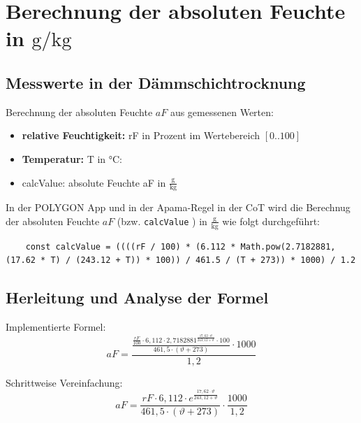 \section{Berechnung der absoluten Feuchte in \texorpdfstring{$\mathrm{g} / \mathrm{kg}$}{g / kg}} 


\subsection{Messwerte in der Dämmschichtrocknung}
Berechnung der absoluten Feuchte $aF$ aus gemessenen Werten:

\begin{itemize}
\item \textbf{relative Feuchtigkeit:} rF in Prozent im Wertebereich $[0 .. 100]$
\item \textbf{Temperatur:} T in °C: 
\item calcValue: absolute Feuchte aF in $\frac{\mathrm{g}}{\mathrm{kg}}$
\end{itemize}

In der POLYGON App und in der Apama-Regel in der CoT wird die Berechnug der absoluten Feuchte $aF$ (bzw. \texttt{calcValue} ) in $\frac{\mathrm{g}}{\mathrm{kg}}$ wie folgt durchgeführt:

\begin{verbatim}  
    const calcValue = ((((rF / 100) * (6.112 * Math.pow(2.7182881, (17.62 * T) / (243.12 + T)) * 100)) / 461.5 / (T + 273)) * 1000) / 1.2
\end{verbatim}

\subsection{Herleitung und Analyse der Formel}
Implementierte Formel:
\begin{equation}
    aF
    = \frac{\frac{\frac{rF}{100} \cdot 6{,}112 \cdot 2{,}7182881^{\frac{17{,}62 \cdot \vartheta}{243{,}12 + \vartheta}} \cdot 100}
                  {461{,}5 \cdot (\vartheta + 273)} \cdot 1000}
            {1{,}2} 
\end{equation}

Schrittweise Vereinfachung:
\begin{equation}
    aF
    = \frac{rF \cdot 6{,}112 \cdot e^{\frac{17{,}62 \cdot \vartheta}{243{,}12 + \vartheta}} }
            {461{,}5 \cdot (\vartheta + 273)}
        \cdot \frac{1000}{1,2}
\end{equation}

